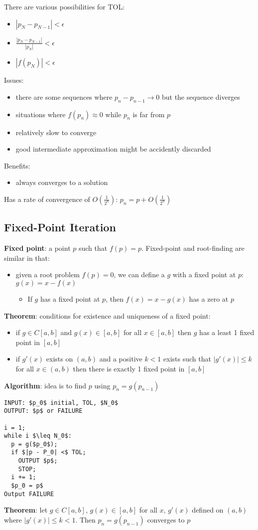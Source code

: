 \documentclass{article}
\begin{document}
There are various possibilities for TOL:
\begin{itemize}
  \item $|p_N - p_{N-1}| < \epsilon$
  \item $\frac{|p_N - p_{N-1}|}{|p_N|} < \epsilon$
  \item $|f(p_N)| < \epsilon$
\end{itemize}

Issues:
\begin{itemize}
  \item there are some sequences where $p_n - p_{n-1} \rightarrow 0$ but the sequence diverges
  \item situations where $f(p_n) \approx 0$ while $p_n$ is far from $p$
  \item relatively slow to converge
  \item good intermediate approximation might be accidently discarded
\end{itemize}
Benefits:
\begin{itemize}
  \item always converges to a solution
\end{itemize}
Has a rate of convergence of $O(\frac{1}{2^n})$: $p_n = p + O(\frac{1}{2^n})$
\subsection{Fixed-Point Iteration}
\textbf{Fixed point}: a point $p$ such that $f(p) = p$. Fixed-point and root-finding are similar in that:
\begin{itemize}
  \item given a root problem $f(p) = 0$, we can define a $g$ with a fixed point at $p$: $g(x) = x - f(x)$
    \begin{itemize}
      \item If $g$ has a fixed point at $p$, then $f(x) = x - g(x)$ has a zero at $p$
    \end{itemize}
\end{itemize}
\textbf{Theorem}: conditions for existence and uniqueness of a fixed point:
\begin{itemize}
  \item if $g \in C[a,b]$ and $g(x) \in [a,b]$ for all $x \in [a,b]$ then $g$ has a least 1 fixed point in $[a,b]$
  \item if $g'(x)$ exists on $(a,b)$ and a positive $k < 1$ exists such that $|g'(x)| \leq k$ for all $x \in (a,b)$ then there is exactly 1 fixed point in $[a,b]$
\end{itemize}
\textbf{Algorithm}: idea is to find $p$ using $p_n = g(p_{n-1})$
\begin{lstlisting}
INPUT: $p_0$ initial, TOL, $N_0$ 
OUTPUT: $p$ or FAILURE

i = 1;
while i $\leq N_0$:
  p = g($p_0$);
  if $|p - P_0| <$ TOL;
    OUTPUT $p$;
    STOP;
  i += 1;
  $p_0 = p$
Output FAILURE
\end{lstlisting}
\textbf{Theorem}: let $g \in C[a,b]$, $g(x) \in [a,b]$ for all $x$, $g'(x)$ defined on $(a,b)$ where $|g'(x)| \leq k < 1$. Then $p_n = g(p_{n-1})$ converges to $p$
\end{document}
